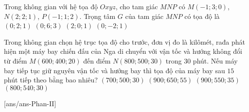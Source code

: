 \begin{ex}%
Trong không gian với hệ tọa độ $Oxyz$, cho tam giác $MNP$ có $M(-1;3;0)$, $N(2;2;1)$, $P(-1;1;2)$. Trọng tâm $G$ của tam giác $MNP$ có tọa độ là
\choice
{\True $(0;2;1)$}
{$(0;6;3)$}
{$(2;0;1)$}
{$(0;-2;1)$}
\end{ex}


\begin{ex}%
Trong không gian chọn hệ trục tọa độ cho trước, đơn vị đo là kilômét, rađa phát hiện một máy bay chiến đấu của Nga di chuyển với vận tốc và hướng không đổi từ điểm $M(600;400;20)$ đến điểm $N(800;500;30)$ trong $30$ phút. Nếu máy bay tiếp tục giữ nguyên vận tốc và hướng bay thì tọa độ của máy bay sau $15$ phút tiếp theo bằng bao nhiêu?
\choice
{$(700;500;30)$}
{$(900;650;55)$}
{\True $(900;550;35)$}
{$(800;540;30)$}
\end{ex}


\TNTF
{}[ans/ans\currfilebase-Phan-II]

